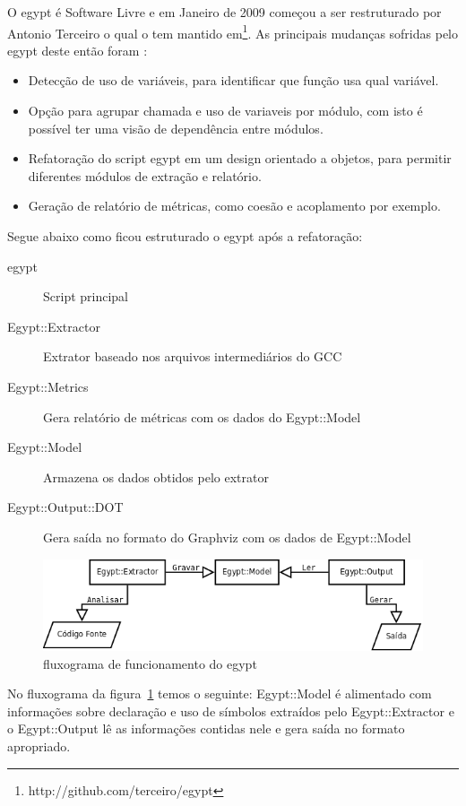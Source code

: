 O egypt é Software Livre e em Janeiro de 2009 começou a ser restruturado por
Antonio Terceiro o qual o tem mantido
em\footnote{http://github.com/terceiro/egypt}. As principais mudanças sofridas
pelo egypt deste então foram \cite{StructuralComplexityEvolution}:

\begin{itemize}
\item Detecção de uso de variáveis, para identificar que função usa qual
variável.
\item Opção para agrupar chamada e uso de variaveis por módulo, com isto é
possível ter uma visão de dependência entre módulos.
\item Refatoração do script egypt em um design orientado a objetos, para
permitir diferentes módulos de extração e relatório.
\item Geração de relatório de métricas, como coesão e acoplamento por exemplo.
\end{itemize}

Segue abaixo como ficou estruturado o egypt após a refatoração:

\begin{description}
\item[egypt] Script principal
\item[Egypt::Extractor] Extrator baseado nos arquivos intermediários do GCC
\item[Egypt::Metrics] Gera relatório de métricas com os dados do Egypt::Model
\item[Egypt::Model] Armazena os dados obtidos pelo extrator
\item[Egypt::Output::DOT] Gera saída no formato do Graphviz com os dados de Egypt::Model
\end{description}

\begin{figure}[h]
\center
\includegraphics[scale=0.4]{imagens/egypt-fluxogram}
\caption{fluxograma de funcionamento do egypt}
\label{egypt-fluxogram}
\end{figure}

No fluxograma da figura~\ref{egypt-fluxogram} temos o seguinte: Egypt::Model é
alimentado com informações sobre declaração e uso de símbolos extraídos pelo
Egypt::Extractor e o Egypt::Output lê as informações contidas nele e gera saída
no formato apropriado.

